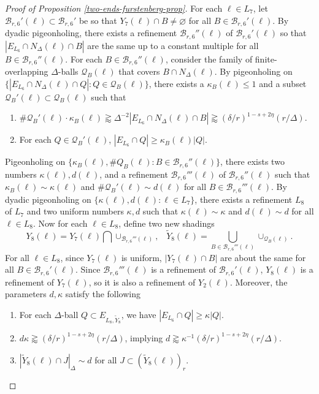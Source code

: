 \documentclass{amsart}
\numberwithin{equation}{section}
\newcommand{\de}{\delta}
\newcommand{\De}{\Delta}
\newcommand{\cq}{\mathcal Q}
\newcommand{\cb}{\mathcal B}
\begin{document}
\begin{proof}[Proof of Proposition \ref{two-ends-furstenberg-prop}]
For each $\ell\in L_7$, let $\cb_{r,6}'(\ell)\subset\cb_{r,6}'$ be so that $Y_7(\ell)\cap B\not=\varnothing$ for all $B\in\cb_{r,6}'(\ell)$.
By dyadic pigeonholing, there exists a refinement $\cb_{r,6}''(\ell)$ of $\cb_{r,6}'(\ell)$ so that $|E_{L_6}\cap N_{\De}(\ell)\cap B|$ are the same up to a constant multiple for all $B\in\cb_{r,6}''(\ell)$. 
For each $B\in\cb_{r,6}''(\ell)$, consider the family of finite-overlapping $\De$-balls $\cq_B(\ell)$ that covers $B\cap N_\De(\ell)$.
By pigeonholing on $\{|E_{L_6}\cap N_{\De}(\ell)\cap Q|:Q\in\cq_B(\ell)\}$, there exists a $\kappa_B(\ell)\leq 1$ and a subset $\cq_B'(\ell)\subset\cq_B(\ell)$ such that 
\begin{enumerate}
    \item $\#\cq_B'(\ell)\cdot\kappa_B(\ell)\gtrapprox \De^{-2}|E_{L_6}\cap N_{\De}(\ell)\cap B|\gtrapprox(\de/r)^{1-s+2\eta}(r/\De)$.
    \item For each $Q\in\cq_B'(\ell)$, $|E_{L_6}\cap Q|\geq\kappa_B(\ell)|Q|$.
\end{enumerate}
Pigeonholing on $\{\kappa_B(\ell),\#Q_B(\ell): B\in\cb_{r,6}''(\ell)\}$, there exists two numbers $\kappa(\ell),d(\ell)$, and a refinement $\cb_{r,6}'''(\ell)$ of $\cb_{r,6}''(\ell)$ such that $\kappa_B(\ell)\sim \kappa(\ell)$ and $\#\cq_B'(\ell)\sim d(\ell)$ for all $B\in \cb_{r,6}'''(\ell)$.
By dyadic pigeonholing on $\{\kappa(\ell),d(\ell): \ell\in L_7\}$, there exists a refinement $L_8$ of $L_7$ and two uniform numbers $\kappa,d$ such that $\kappa(\ell)\sim \kappa$ and $d(\ell)\sim d$ for all $\ell\in L_8$.
Now for each $\ell\in L_8$,  define two new shadings
\begin{equation}
\label{caseC-Y-8}
    Y_8(\ell)=Y_7(\ell)\bigcap\cup_{\cb_{r,6}'''(\ell)},\,\,\,\,\,\tilde Y_8(\ell)=\bigcup_{B\in\cb_{r,6}'''(\ell)}\cup_{\cq_B(\ell)}.
\end{equation}
For all $\ell\in L_8$, since $Y_7(\ell)$ is uniform, $|Y_7(\ell)\cap B|$ are about the same for all $B\in\cb_{r,6}'(\ell)$.
Since $\cb_{r,6}'''(\ell)$ is a refinement of $\cb_{r,6}'(\ell)$, $Y_8(\ell)$ is a refinement of $Y_7(\ell)$, so it is also a refinement of $Y_2(\ell)$.
Moreover, the parameters $d,\kappa$ satisfy the following
\begin{enumerate}
    \item For each $\De$-ball $Q\subset E_{L_8, \tilde Y_8}$, we have $|E_{L_6}\cap Q|\geq \kappa|Q|$.
    \item $d\kappa\gtrapprox(\de/r)^{1-s+2\eta}(r/\De)$, implying $d\gtrapprox \kappa^{-1}(\de/r)^{1-s+2\eta}(r/\De)$.
    \item $|\tilde Y_8(\ell)\cap J|_\De\sim d$ for all $J\subset (\tilde Y_8(\ell))_r$.
\end{enumerate}



\end{proof}
\end{document}
